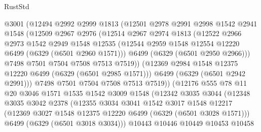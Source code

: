 \begin{lexlean}{RustStd}
\begin{coremodule}
{\begin{coremodule}
{{{{{{{{{{{{{{{{{{{{{{{{{{{{{{{{{{{                    @3001
                    (@12494
                      @2992
                      @2999
                      @1813
                      (@12501
                        @2978
                        @2991
                        @2998
                        @1542
                        @2941
                        @1548
                        (@12509
                          @2967
                          @2976
                          (@12514
                            @2967
                            @2974
                            @1813
                            (@12522
                              @2966
                              @2973
                              @1542
                              @2949
                              @1548
                              @12535
                              (@12544 @2959 @1548 @12554 @12220 @6499 (@6329 (@6501 @2960 @1571)))
                              @6499
                              (@6329 (@6501 @2950 @2966)))
                            @7498
                            @7501
                            @7504
                            @7508
                            @7513
                            @7519))
                        (@12369 @2984 @1548 @12375 @12220 @6499 (@6329 (@6501 @2985 @1571)))
                        @6499
                        (@6329 (@6501 @2942 @2991)))
                      @7498
                      @7501
                      @7504
                      @7508
                      @7513
                      @7519))
                  (@12176
                    @555
                    @78
                    @11
                    @20
                    @3046
                    @1571
                    @1535
                    @1542
                    @3009
                    @1548
                    (@12342
                      @3035
                      @3044
                      (@12348
                        @3035
                        @3042
                        @2378
                        (@12355
                          @3034
                          @3041
                          @1542
                          @3017
                          @1548
                          @12217
                          (@12369 @3027 @1548 @12375 @12220 @6499 (@6329 (@6501 @3028 @1571)))
                          @6499
                          (@6329 (@6501 @3018 @3034)))
                        @10443
                        @10446
                        @10449
                        @10453
                        @10458
}}}}}}}}}}}}}}}}}}}}}}}}}}}}}}}}}}}
\end{coremodule}}
\end{coremodule}
\end{lexlean}
